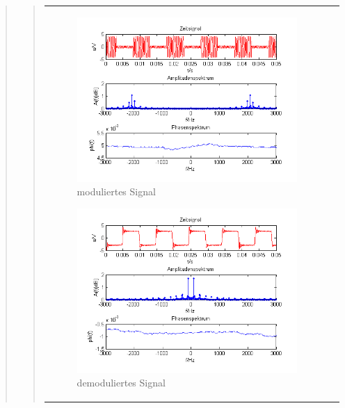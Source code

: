 \begin{quote}
\begin{quote}
\begin{center}
\begin{tabular}{ll}
\begin{minipage}{0.67\textwidth}
                \begin{figure}[H]
                    \includegraphics[scale=0.7]{Bilder/Am_Rec_2k_100Hz_mo}
                    \caption{moduliertes Signal}
                    \label{fig:DemorecmT}
                \end{figure}
        
            \end{minipage}
        
            \begin{minipage}{0.67\textwidth}
                \begin{figure}[H]
                    \includegraphics[scale=0.7]{Bilder/Demo_Rec_2k_100Hz_mo_mitTiefpass}
                    \caption{demoduliertes Signal}
                    \label{fig:DemorecmT2}
                \end{figure}
        
            \end{minipage}
        
        \end{tabular}
        \end{center}
        
    \end{quote}
    
\end{quote}


